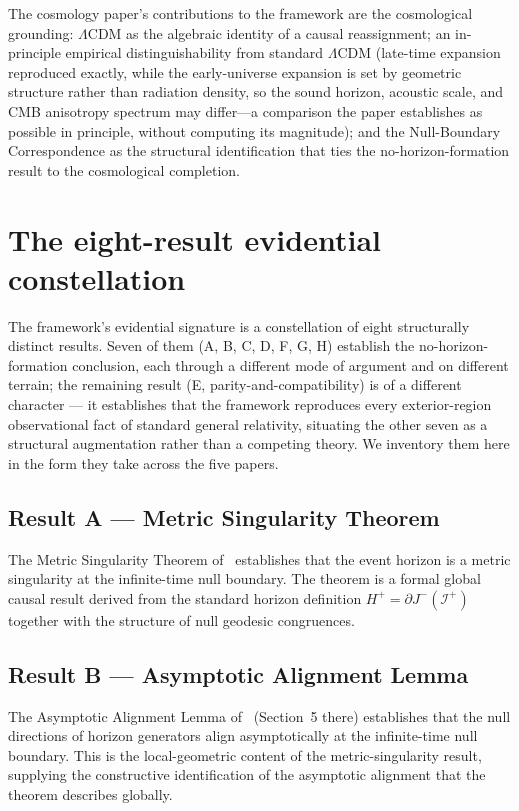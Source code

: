 \documentclass[11pt,a4paper]{article}
\theoremstyle{definition}
\begin{document}
The cosmology paper's contributions to the framework are the cosmological grounding: $\Lambda$CDM as the algebraic identity of a causal reassignment; an in-principle empirical distinguishability from standard $\Lambda$CDM (late-time expansion reproduced exactly, while the early-universe expansion is set by geometric structure rather than radiation density, so the sound horizon, acoustic scale, and CMB anisotropy spectrum may differ---a comparison the paper establishes as possible in principle, without computing its magnitude); and the Null-Boundary Correspondence as the structural identification that ties the no-horizon-formation result to the cosmological completion.

\section{The eight-result evidential constellation}\label{sec:constellation}

The framework's evidential signature is a constellation of eight structurally distinct results. Seven of them (A, B, C, D, F, G, H) establish the no-horizon-formation conclusion, each through a different mode of argument and on different terrain; the remaining result (E, parity-and-compatibility) is of a different character --- it establishes that the framework reproduces every exterior-region observational fact of standard general relativity, situating the other seven as a structural augmentation rather than a competing theory. We inventory them here in the form they take across the five papers.

\subsection{Result A --- Metric Singularity Theorem}\label{sec:result-A}

The Metric Singularity Theorem of~\cite{JanzenBHcausality} establishes that the event horizon is a metric singularity at the infinite-time null boundary. The theorem is a formal global causal result derived from the standard horizon definition $H^{+}=\partial J^{-}(\mathscr{I}^{+})$ together with the structure of null geodesic congruences.

\subsection{Result B --- Asymptotic Alignment Lemma}\label{sec:result-B}

The Asymptotic Alignment Lemma of~\cite{JanzenBHcausality} (Section~5 there) establishes that the null directions of horizon generators align asymptotically at the infinite-time null boundary. This is the local-geometric content of the metric-singularity result, supplying the constructive identification of the asymptotic alignment that the theorem describes globally.
\end{document}
